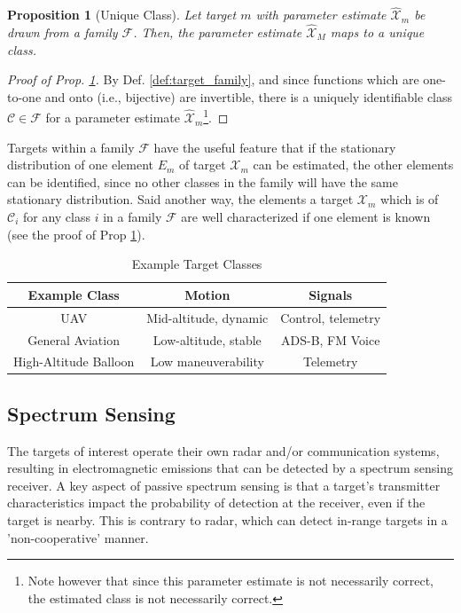 \documentclass[journal,12pt,onecolumn,draftclsnofoot,]{IEEEtran}
\newtheorem{prop}{Proposition}
\theoremstyle{definition}
\begin{document}
\begin{prop}[Unique Class]
\label{prop:unique}
Let target $m$ with parameter estimate $\hat{\mathcal{X}}_m$ be drawn from a family $\mathcal{F}$. Then, the parameter estimate $\hat{\mathcal{X}}_M$ maps to a unique class. 
\end{prop}

\begin{proof}[Proof of Prop. \ref{prop:unique}]
By Def. \ref{def:target_family}, and since functions which are one-to-one and onto (i.e., bijective) are invertible, there is a uniquely identifiable class $\mathcal{C}\in\mathcal{F}$ for a parameter estimate $\hat{\mathcal{X}}_m$\footnote{Note however that since this parameter estimate is not necessarily correct, the estimated class is not necessarily correct. }. 
\end{proof}


Targets within a family $\mathcal{F}$ have the useful feature that if the stationary distribution of one element $E_m$ of target $\mathcal{X}_m$ can be estimated, the other elements can be identified, since no other classes in the family will have the same stationary distribution. 
Said another way, the elements a target $\mathcal{X}_m$ which is of $\mathcal{C}_i$ for any class $i$ in a family $\mathcal{F}$ are well characterized if one element is known (see the proof of Prop \ref{prop:unique}).

\begin{table}
    \centering
    \caption{Example Target Classes}
    \begin{tabular}{c|c|c}
        Example Class & Motion & Signals \\[0.5ex] 
        \hline
        UAV & Mid-altitude, dynamic & Control, telemetry \\
        General Aviation & Low-altitude, stable & ADS-B, FM Voice \\
        High-Altitude Balloon & Low maneuverability & Telemetry \\ [1ex] 
    \end{tabular}    
    \label{tab:classes}
\end{table}

\subsection{Spectrum Sensing}
\label{ss:sensing}
The targets of interest operate their own radar and/or communication systems, resulting in electromagnetic emissions that can be detected by a spectrum sensing receiver.
A key aspect of passive spectrum sensing is that a target's transmitter characteristics impact the probability of detection at the receiver, even if the target is nearby. 
This is contrary to radar, which can detect in-range targets in a 'non-cooperative' manner.
\end{document}
